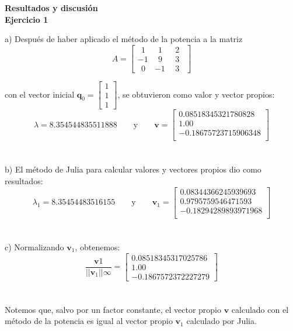 \documentclass[11pt]{article}
\begin{document}
\\
\\
\noindent
\textbf{\LARGE{Resultados y discusión}}
\\
\noindent
\textbf{Ejercicio 1}

a) Después de haber aplicado el método de la potencia a la matriz
$$
A =
\begin{bmatrix}
\ \ 1 & \ \ 1 & \ \ 2 \ \ \\
-1 & \ \ 9 & \ \ 3 \ \ \\
\ \ 0 & -1 & \ \ 3 \ \
\end{bmatrix}
$$

con el vector inicial $\textbf{q}_0 =
\begin{bmatrix}
1 \\
1 \\
1
\end{bmatrix}$, se obtuvieron como valor y vector propios:
 \[
 \lambda = 8.354544835511888
 \qquad\text{y}\qquad
 \textbf{v} = \begin{bmatrix}
 0.08518345321780828 \\
 1.00     \\
 -0.18675723715906348 \\
\end{bmatrix}
 \]
 \\
 \\

b) El método de Julia para calcular valores y vectores propios dio como resultados:
\[
 \lambda_1 = 8.35454483516155
 \qquad\text{y}\qquad
 \textbf{v}_1 = \begin{bmatrix}
0.08344366245939693 \\
0.9795759546471593 \\
-0.18294289893971968 \\
\end{bmatrix}
 \]
 \\
 \\

 c) Normalizando $\textbf{v}_1$, obtenemos:
 $$\frac{\textbf{v}1}{||\textbf{v}_1||\infty} =
\begin{bmatrix}
0.08518345317025786 \\
1.00 \\
-0.1867572372227279
\end{bmatrix}$$
\\
\\

Notemos que, salvo por un factor constante, el vector propio $\textbf{v}$ calculado con el método de la potencia es igual al vector propio $\textbf{v}_1$ calculado por Julia.
\\
\\
\end{document}
